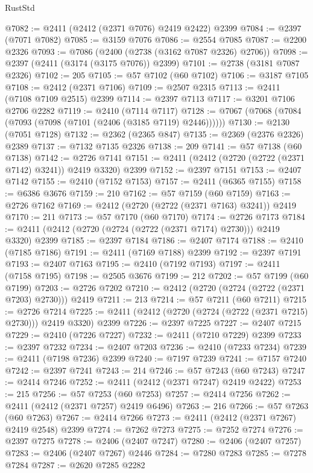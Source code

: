 \begin{lexlean}{RustStd}
\begin{coremodule}
@7082 := @2411 (@2412 (@2371 @7076) @2419 @2422) @2399
@7084 := @2397 (@7071 @7082)
@7085 := @3159 @7076
@7086 := @2554 @7085
@7087 := @2200 @2326
@7093 := @7086 (@2400 (@2738 (@3162 @7087 @2326) @2706))
@7098 := @2397 (@2411 (@3174 (@3175 @7076)) @2399)
@7101 := @2738 (@3181 @7087 @2326)
@7102 := 205
@7105 := @57 @7102 (@60 @7102)
@7106 := @3187 @7105
@7108 := @2412 (@2371 @7106)
@7109 := @2507 @2315
@7113 := @2411 (@7108 @7109 @2515) @2399
@7114 := @2397 @7113
@7117 := @3201 @7106 @2706 @2282
@7119 := @2410 (@7114 @7117)
@7128 := @7067 (@7068 (@7084 (@7093 (@7098 (@7101 (@2406 (@3185 @7119) @2446))))))
@7130 := @2130 (@7051 @7128)
@7132 := @2362 (@2365 @847)
@7135 := @2369 (@2376 @2326) @2389
@7137 := @7132 @7135 @2326
@7138 := 209
@7141 := @57 @7138 (@60 @7138)
@7142 := @2726 @7141
@7151 := @2411 (@2412 (@2720 (@2722 (@2371 @7142) @3241)) @2419 @3320) @2399
@7152 := @2397 @7151
@7153 := @2407 @7142
@7155 := @2410 (@7152 @7153)
@7157 := @2411 (@6365 @7155)
@7158 := @6386 @3676
@7159 := 210
@7162 := @57 @7159 (@60 @7159)
@7163 := @2726 @7162
@7169 := @2412 (@2720 (@2722 (@2371 @7163) @3241)) @2419
@7170 := 211
@7173 := @57 @7170 (@60 @7170)
@7174 := @2726 @7173
@7184 := @2411 (@2412 (@2720 (@2724 (@2722 (@2371 @7174) @2730))) @2419 @3320) @2399
@7185 := @2397 @7184
@7186 := @2407 @7174
@7188 := @2410 (@7185 @7186)
@7191 := @2411 (@7169 @7188) @2399
@7192 := @2397 @7191
@7193 := @2407 @7163
@7195 := @2410 (@7192 @7193)
@7197 := @2411 (@7158 @7195)
@7198 := @2505 @3676
@7199 := 212
@7202 := @57 @7199 (@60 @7199)
@7203 := @2726 @7202
@7210 := @2412 (@2720 (@2724 (@2722 (@2371 @7203) @2730))) @2419
@7211 := 213
@7214 := @57 @7211 (@60 @7211)
@7215 := @2726 @7214
@7225 := @2411 (@2412 (@2720 (@2724 (@2722 (@2371 @7215) @2730))) @2419 @3320) @2399
@7226 := @2397 @7225
@7227 := @2407 @7215
@7229 := @2410 (@7226 @7227)
@7232 := @2411 (@7210 @7229) @2399
@7233 := @2397 @7232
@7234 := @2407 @7203
@7236 := @2410 (@7233 @7234)
@7239 := @2411 (@7198 @7236) @2399
@7240 := @7197 @7239
@7241 := @7157 @7240
@7242 := @2397 @7241
@7243 := 214
@7246 := @57 @7243 (@60 @7243)
@7247 := @2414 @7246
@7252 := @2411 (@2412 (@2371 @7247) @2419 @2422)
@7253 := 215
@7256 := @57 @7253 (@60 @7253)
@7257 := @2414 @7256
@7262 := @2411 (@2412 (@2371 @7257) @2419 @6496)
@7263 := 216
@7266 := @57 @7263 (@60 @7263)
@7267 := @2414 @7266
@7273 := @2411 (@2412 (@2371 @7267) @2419 @2548) @2399
@7274 := @7262 @7273
@7275 := @7252 @7274
@7276 := @2397 @7275
@7278 := @2406 (@2407 @7247)
@7280 := @2406 (@2407 @7257)
@7283 := @2406 (@2407 @7267) @2446
@7284 := @7280 @7283
@7285 := @7278 @7284
@7287 := @2620 @7285 @2282

\end{coremodule}
\end{lexlean}
